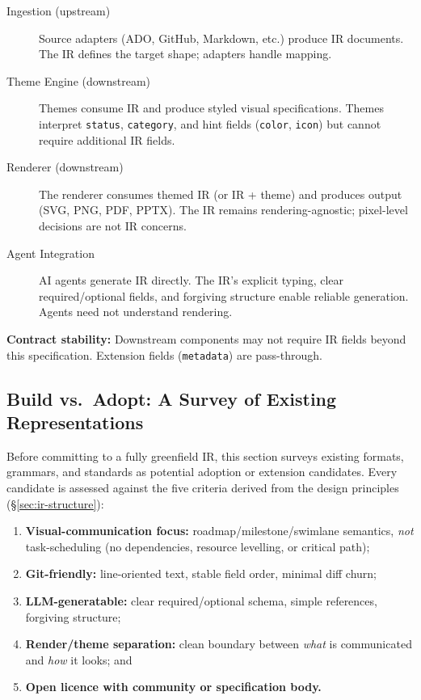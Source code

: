 \begin{description}
  \item[Ingestion (upstream)] Source adapters (ADO, GitHub, Markdown, etc.) produce
        IR documents. The IR defines the target shape; adapters handle mapping.

  \item[Theme Engine (downstream)] Themes consume IR and produce styled visual
        specifications. Themes interpret \texttt{status}, \texttt{category}, and
        hint fields (\texttt{color}, \texttt{icon}) but cannot require additional
        IR fields.

  \item[Renderer (downstream)] The renderer consumes themed IR (or IR + theme) and
        produces output (SVG, PNG, PDF, PPTX). The IR remains rendering-agnostic;
        pixel-level decisions are not IR concerns.

  \item[Agent Integration] AI agents generate IR directly. The IR's explicit typing,
        clear required/optional fields, and forgiving structure enable reliable
        generation. Agents need not understand rendering.
\end{description}

\textbf{Contract stability:} Downstream components may not require IR fields beyond
this specification. Extension fields (\texttt{metadata}) are pass-through.


\subsection{Build vs.\ Adopt: A Survey of Existing Representations}
\label{sec:ir-build-vs-adopt}

Before committing to a fully greenfield IR, this section surveys existing formats,
grammars, and standards as potential adoption or extension candidates. Every
candidate is assessed against the five criteria derived from the design principles
(\S\ref{sec:ir-structure}):
\begin{enumerate}
  \item \textbf{Visual-communication focus:} roadmap/milestone/swimlane semantics,
        \emph{not} task-scheduling (no dependencies, resource levelling, or
        critical path);
  \item \textbf{Git-friendly:} line-oriented text, stable field order, minimal diff
        churn;
  \item \textbf{LLM-generatable:} clear required/optional schema, simple references,
        forgiving structure;
  \item \textbf{Render/theme separation:} clean boundary between \emph{what} is
        communicated and \emph{how} it looks; and
  \item \textbf{Open licence with community or specification body.}
\end{enumerate}

